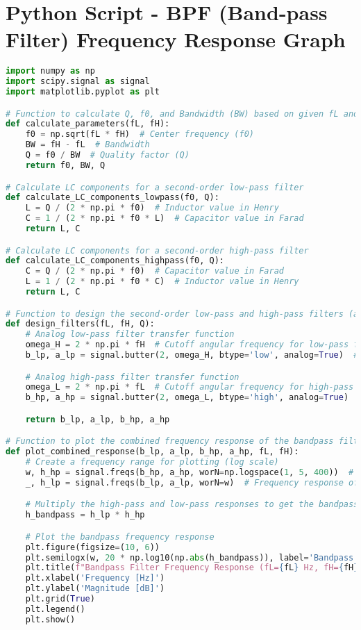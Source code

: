 \section{Python Script -  BPF (Band-pass Filter) Frequency Response Graph}
\begin{lstlisting}[language=Python]
    import numpy as np
import scipy.signal as signal
import matplotlib.pyplot as plt

# Function to calculate Q, f0, and Bandwidth (BW) based on given fL and fH
def calculate_parameters(fL, fH):
    f0 = np.sqrt(fL * fH)  # Center frequency (f0)
    BW = fH - fL  # Bandwidth
    Q = f0 / BW  # Quality factor (Q)
    return f0, BW, Q

# Calculate LC components for a second-order low-pass filter
def calculate_LC_components_lowpass(f0, Q):
    L = Q / (2 * np.pi * f0)  # Inductor value in Henry
    C = 1 / (2 * np.pi * f0 * L)  # Capacitor value in Farad
    return L, C

# Calculate LC components for a second-order high-pass filter
def calculate_LC_components_highpass(f0, Q):
    C = Q / (2 * np.pi * f0)  # Capacitor value in Farad
    L = 1 / (2 * np.pi * f0 * C)  # Inductor value in Henry
    return L, C

# Function to design the second-order low-pass and high-pass filters (analog)
def design_filters(fL, fH, Q):
    # Analog low-pass filter transfer function
    omega_H = 2 * np.pi * fH  # Cutoff angular frequency for low-pass filter
    b_lp, a_lp = signal.butter(2, omega_H, btype='low', analog=True)  # Butterworth filter

    # Analog high-pass filter transfer function
    omega_L = 2 * np.pi * fL  # Cutoff angular frequency for high-pass filter
    b_hp, a_hp = signal.butter(2, omega_L, btype='high', analog=True)  # Butterworth filter

    return b_lp, a_lp, b_hp, a_hp

# Function to plot the combined frequency response of the bandpass filter
def plot_combined_response(b_lp, a_lp, b_hp, a_hp, fL, fH):
    # Create a frequency range for plotting (log scale)
    w, h_hp = signal.freqs(b_hp, a_hp, worN=np.logspace(1, 5, 400))  # Frequency response of HPF
    _, h_lp = signal.freqs(b_lp, a_lp, worN=w)  # Frequency response of LPF

    # Multiply the high-pass and low-pass responses to get the bandpass response
    h_bandpass = h_lp * h_hp

    # Plot the bandpass frequency response
    plt.figure(figsize=(10, 6))
    plt.semilogx(w, 20 * np.log10(np.abs(h_bandpass)), label='Bandpass Filter Response')
    plt.title(f"Bandpass Filter Frequency Response (fL={fL} Hz, fH={fH} Hz)")
    plt.xlabel('Frequency [Hz]')
    plt.ylabel('Magnitude [dB]')
    plt.grid(True)
    plt.legend()
    plt.show()


\end{lstlisting}
